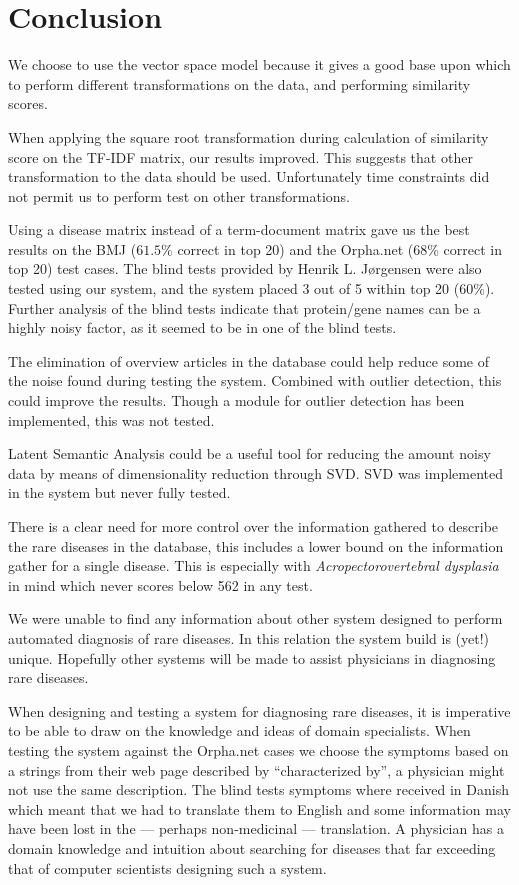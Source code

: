 \chapter{Conclusion\label{Conclusion}}

We choose to use the vector space model because it gives a good base
upon which to perform different transformations on the data, and performing
similarity scores.

When applying the square root transformation during calculation of
similarity score on the TF-IDF matrix, our results improved. This
suggests that other transformation to the data should be
used. Unfortunately time constraints did not permit us to perform test on other
transformations.

Using a disease matrix instead of a term-document matrix gave us the
best results on the BMJ ($61.5\%$ correct in top 20) and the Orpha.net
($68\%$ correct in top 20) test cases. The blind tests provided by
Henrik L. J\o rgensen were also tested using our system, and the
system placed 3 out of 5 within top 20 ($60\%$). Further analysis of
the blind tests indicate that protein/gene names can be a highly noisy
factor, as it seemed to be in one of the blind tests.

The elimination of overview articles in the database could help reduce
some of the noise found during testing the system. Combined with
outlier detection, this could improve the results.
Though a module for outlier detection has been implemented, this was 
not tested.

Latent Semantic Analysis could be a useful tool for reducing the amount 
noisy data by means of dimensionality reduction through SVD. SVD was 
implemented in the system but never fully tested.

There is a clear need for more control over the information gathered to
describe the rare diseases in the database, this includes a lower
bound on the information gather for a single disease. This is
especially with \textit{Acropectorovertebral dysplasia} in mind which never
scores below 562 in any test.

We were unable to find any information about other system designed to
perform automated diagnosis of rare diseases. In this relation
the system build is (yet!) unique. Hopefully other systems will be
made to assist physicians in diagnosing rare diseases.

When designing and testing a system for diagnosing rare diseases, it is
imperative to be able to draw on the knowledge and ideas of domain
specialists. When testing the system against the Orpha.net cases we
choose the symptoms based on a strings from their web page described
by ``characterized by'', a physician might not use the same
description. The blind tests symptoms where received in Danish which
meant that we had to translate them to English and some information
may have been lost in the --- perhaps non-medicinal --- translation. A physician has a domain
knowledge and intuition about searching for diseases that far exceeding
that of computer scientists designing such a system.

